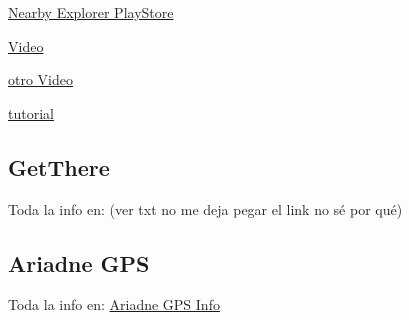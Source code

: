 \documentclass{article}
\begin{document}
	\textcolor{blue}{\href{	https://play.google.com/store/apps/details?id=org.aph.nearbyonline&hl=es}{Nearby Explorer PlayStore}}
	
	\textcolor{blue}{\href{https://www.youtube.com/watch?v=Vlc0Pjv4Qro}{Video}}
	
	\textcolor{blue}{\href{https://www.youtube.com/watch?v=f2zE_yEL1Og}{ otro Video}}
	
	\textcolor{blue}{\href{https://www.youtube.com/watch?v=I_cJcOl5MPE}{tutorial}}
	
	
	
	\subsection{GetThere}
	Toda la info en: (ver txt no me deja pegar el link no sé por qué)
	 
	
	\subsection{Ariadne GPS}
	Toda la info en:
	\textcolor{blue}{\href{http://www.ariadnegps.eu/}{Ariadne GPS Info}}
 
	
\end{document}
